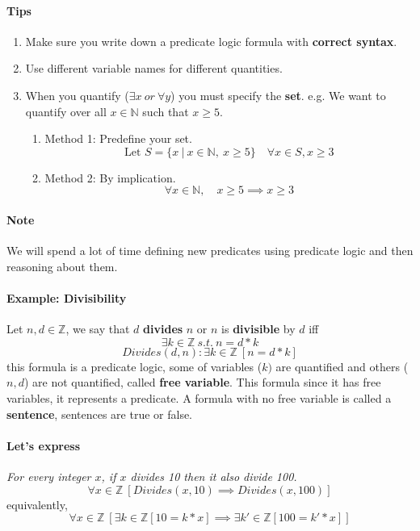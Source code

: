 \documentclass{article}
\begin{document}
	\paragraph{Tips}
	\begin{enumerate}
		\item Make sure you write down a predicate logic formula with \textbf{correct syntax}.
		\item Use different variable names for different quantities.
		\item When you quantify ($\exists x\ or\ \forall y$) you must specify the \textbf{set}. e.g. We want to quantify over all $x \in \mathbb{N}$ such that $x \geq 5$.
		\begin{enumerate}
			\item Method 1: Predefine your set.
				\[
				\text{Let } S = \{x\ \vert\ x \in \mathbb{N},\ x\geq 5 \}
				\quad \forall x \in S, x \geq 3
				\]
			\item Method 2: By implication.
				\[
				\forall x\in \mathbb{N},\quad x \geq 5 \implies x \geq 3
				\]
		\end{enumerate}
	\end{enumerate}
	\paragraph{Note} We will spend a lot of time defining new predicates using predicate logic and then reasoning about them.
	\paragraph{Example: Divisibility} Let $n,d\in\mathbb{Z}$, we say that $d$ \textbf{divides} $n$ or $n$ is \textbf{divisible} by $d$ iff
	\[
	\exists k \in \mathbb{Z}\ s.t.\ n = d*k
	\]
	\[
	Divides(d,n): \exists k \in \mathbb{Z}\ [n = d*k]
	\]
	this formula is a predicate logic, some of variables ($k)$ are quantified and others ($n,d$) are not quantified, called \textbf{free variable}. This formula since it has free variables, it represents a predicate.
	\newline A formula with no free variable is called a \textbf{sentence}, sentences are true or false.
	\paragraph{Let's express} \emph{For every integer $x$, if $x$ divides 10 then it also divide 100.}
	\[
	\forall x \in \mathbb{Z}\ [Divides(x,10) \implies Divides(x,100)]
	\]
	equivalently,
	\[
	\forall x \in \mathbb{Z}\ [\exists k \in \mathbb{Z}[10 = k*x] \implies \exists k' \in \mathbb{Z} [100 = k'*x]]
	\]
\end{document}
